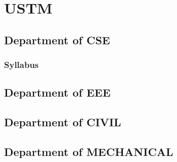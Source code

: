 \documentclass{article}
\begin{document}
\section{USTM}
\subsection{Department of CSE}
\subsubsection{Syllabus}
\subsection{Department of EEE}
\subsection{Department of CIVIL}
\subsection{Department of MECHANICAL}
\end{document}
